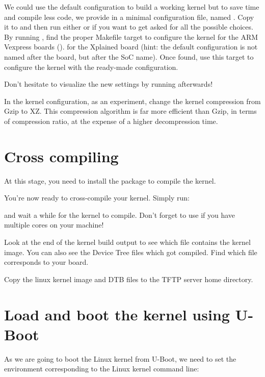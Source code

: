 {
We could use the  default configuration to
build a working kernel but to save time and compile less code, we
provide in
 a minimal configuration
file, named . Copy it to  and
then run either  or  if
you want to get asked for all the possible choices.
}
{
By running , find the proper Makefile target to
configure the kernel
{for the ARM Vexpress boards ().}
{for the Xplained board (hint: the default
configuration is not named after the board, but after the SoC
name). Once found, use this target to configure the kernel with the
ready-made configuration.}
}

Don't hesitate to visualize the new settings by running
 afterwards!

In the kernel configuration, as an experiment, change the kernel
compression from Gzip to XZ. This compression algorithm is far more
efficient than Gzip, in terms of compression ratio, at the expense of
a higher decompression time.

\section{Cross compiling}

At this stage, you need to install the 
package to compile the kernel.

You're now ready to cross-compile your kernel. Simply run:


and wait a while for the kernel to compile. Don't forget to use
 if you have multiple cores on your machine!

Look at the end of the kernel build output to see which file contains
the kernel image. You can also see the Device Tree  files
which got compiled. Find which  file corresponds to your
board.

Copy the linux kernel image and DTB files to the TFTP server
home directory.

\section{Load and boot the kernel using U-Boot}

As we are going to boot the Linux kernel from U-Boot,
we need to set the  environment corresponding
to the Linux kernel command line:

